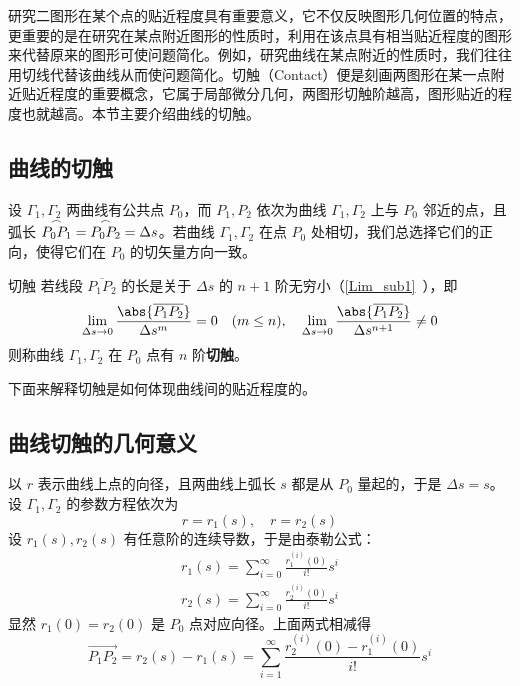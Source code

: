 研究二图形在某个点的贴近程度具有重要意义，它不仅反映图形几何位置的特点，更重要的是在研究在某点附近图形的性质时，利用在该点具有相当贴近程度的图形来代替原来的图形可使问题简化。例如，研究曲线在某点附近的性质时，我们往往用切线代替该曲线从而使问题简化。切触（Contact）便是刻画两图形在某一点附近贴近程度的重要概念，它属于局部微分几何，两图形切触阶越高，图形贴近的程度也就越高。本节主要介绍曲线的切触。
\subsection{曲线的切触}
设 $\Gamma_1,\Gamma_2$ 两曲线有公共点 $P_0$，而 $P_1,P_2$ 依次为曲线 $\Gamma_1,\Gamma_2$ 上与 $P_0$ 邻近的点，且弧长 $\overset{\Huge\frown}{P_0P_1}=\overset{\Huge\frown}{P_0P_2}=\Delta s$。若曲线  $\Gamma_1,\Gamma_2$ 在点 $P_0$ 处相切，我们总选择它们的正向，使得它们在 $P_0$ 的切矢量方向一致。
\begin{definition}{切触}\label{CofCur_def1}
若线段 $\overline{P_1P_2}$ 的长是关于 $\Delta s$ 的 $n+1$ 阶无穷小（\autoref{Lim_sub1}~），即
\begin{equation}
\lim_{\Delta s\rightarrow0}\frac{\abs{\overline{P_1P_2}}}{\Delta s^{m}}=0\quad(m\leq n),\quad\lim_{\Delta s\rightarrow0}\frac{\abs{\overline{P_1P_2}}}{\Delta s^{n+1}}\neq0
\end{equation}
则称曲线 $\Gamma_1,\Gamma_2$ 在 $P_0$ 点有 $n$ 阶\textbf{切触}。
\end{definition}
下面来解释切触是如何体现曲线间的贴近程度的。
\subsection{曲线切触的几何意义}
以 $r$ 表示曲线上点的向径，且两曲线上弧长 $s$ 都是从 $P_0$ 量起的，于是 $\Delta s=s$。设 $\Gamma_1,\Gamma_2$ 的参数方程依次为
\begin{equation}
r=r_1(s),\quad r=r_2(s)
\end{equation}
设 $r_1(s),r_2(s)$ 有任意阶的连续导数，于是由泰勒公式：
\begin{equation}
\begin{aligned}
r_1(s)=\sum_{i=0}^\infty \frac{r^{(i)}_1(0)}{i!}s^i\\
r_2(s)=\sum_{i=0}^\infty \frac{r^{(i)}_2(0)}{i!}s^i
\end{aligned}
\end{equation}
显然 $r_1(0)=r_2(0)$ 是 $P_0$ 点对应向径。上面两式相减得
\begin{equation}\label{CofCur_eq1}
\overrightarrow{P_1P_2}=r_2(s)-r_1(s)=\sum_{i=1}^\infty \frac{r^{(i)}_2(0)-r^{(i)}_1(0)}{i!}s^i
\end{equation}

